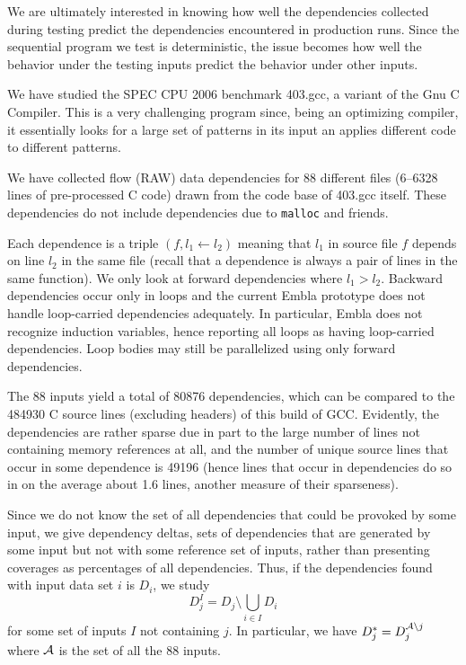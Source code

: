 \documentclass[times, 10pt,twocolumn]{article}
\begin{document}
We are ultimately interested in knowing how well the dependencies
collected during testing predict the dependencies encountered in
production runs.  Since the sequential program we test is
deterministic, the issue becomes how well the behavior under the
testing inputs predict the behavior under other inputs.

We have studied the SPEC CPU 2006
benchmark 403.gcc, a variant of the Gnu C
Compiler. This is a very challenging program since, being an
optimizing compiler, it essentially looks for a large set of patterns
in its input an applies different code to different patterns.

We have collected flow (RAW) data dependencies for 88 different files
(6--6328 lines of pre-processed C code) drawn from the code base of
403.gcc itself. These dependencies do not include dependencies due to
{\tt malloc} and friends.

Each dependence is a triple $({ f}, { l}_1 \leftarrow { l}_2)$
meaning that $ l_1$ in source file $ f$ depends on line
$ l_2$ in the same file (recall that a dependence is always a
pair of lines in the same function). We only look at forward dependencies where 
$l_1>l_2$. Backward dependencies occur only in loops and the current
Embla prototype does not handle loop-carried dependencies adequately.
In particular, Embla does not recognize induction variables, hence
reporting all loops as having loop-carried dependencies. Loop bodies 
may still be parallelized using only forward dependencies.

The 88 inputs yield a total of 80876 dependencies, which
can be compared to the 484930 C source lines (excluding headers) of
this build of GCC. Evidently, the dependencies are rather sparse due
in part to the large number of lines not containing memory references at all,
and the number of unique source lines that occur in some dependence is
49196 (hence lines that occur in dependencies do so in on the average
about 1.6 lines, another measure of their sparseness).

Since we do not know the set of all dependencies that could be
provoked by some input, we give dependency deltas, sets of
dependencies that are generated by some input but not with some
reference set of inputs, rather than presenting coverages as
percentages of all dependencies. Thus, if the dependencies found with input data set $i$ is
$D_i$, we study \[D_j^I = D_j \setminus \bigcup_{i \in I} D_i\] for
some set of inputs $I$ not containing $j$. In particular, we have
$D_j^\ast = D_j^{{\cal A} \setminus j}$ where $\cal A$ is the set of
all the 88 inputs.
\end{document}
